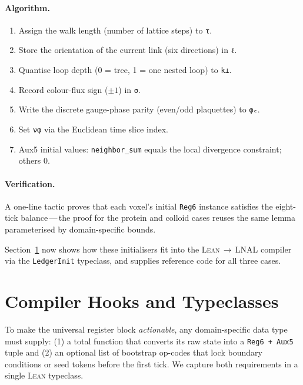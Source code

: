 \documentclass[11pt,a4paper]{article}
\begin{document}
\paragraph{Algorithm.}
\begin{enumerate}
  \item Assign the walk length (number of lattice steps) to
        \texttt{τ}.
  \item Store the orientation of the current link (six directions)
        in \texttt{ℓ}.
  \item Quantise loop depth (0 = tree, 1 = one nested loop) to
        \texttt{k⊥}.
  \item Record colour-flux sign ($\pm1$) in \texttt{σ}.
  \item Write the discrete gauge-phase parity (even/odd plaquettes) to
        \texttt{φₑ}.
  \item Set \texttt{νφ} via the Euclidean time slice index.
  \item Aux5 initial values: \texttt{neighbor\_sum} equals the local
        divergence constraint; others $0$.
\end{enumerate}

\paragraph{Verification.}
A one-line tactic proves that each voxel’s initial \texttt{Reg6}
instance satisfies the eight-tick balance\,—\,the proof for the protein
and colloid cases reuses the same lemma parameterised by domain-specific
bounds.

\bigskip
Section~\ref{sec:compiler} now shows how these initialisers fit into the
\textsc{Lean}\,$\to$\,LNAL compiler via the \texttt{LedgerInit}
typeclass, and supplies reference code for all three cases.
\section{Compiler Hooks and Typeclasses}
\label{sec:compiler}

\noindent
To make the universal register block \emph{actionable}, any
domain-specific data type must supply:
(1) a total function that converts its raw state into a
\texttt{Reg6\,+\,Aux5} tuple and
(2) an optional list of bootstrap op-codes that lock boundary
conditions or seed tokens before the first tick.
We capture both requirements in a single \textsc{Lean} typeclass.
\end{document}
